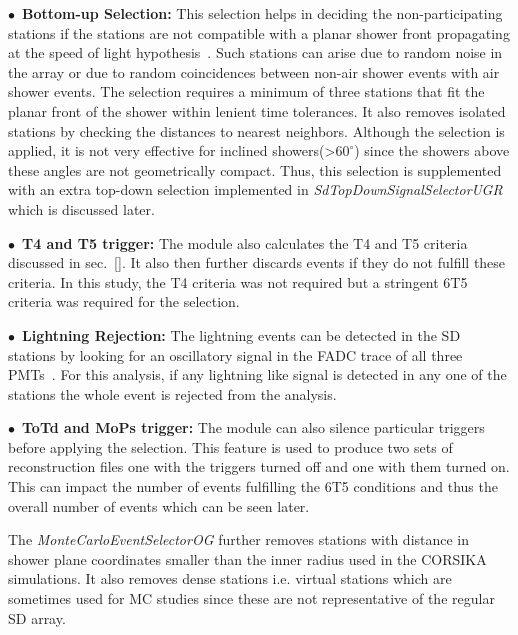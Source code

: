 \begin{description}
  \item $\bullet$~\textbf{Bottom-up Selection:} This selection helps in deciding the non-participating stations if the stations are not compatible with a planar shower front propagating at the speed of light hypothesis~\cite{}. Such stations can arise due to random noise in the array or due to random coincidences between non-air shower events with air shower events. The selection requires a minimum of three stations that fit the planar front of the shower within lenient time tolerances. It also removes isolated stations by checking the distances to nearest neighbors. Although the selection is applied, it is not very effective for inclined showers(>$60^{\circ}$) since the showers above these angles are not geometrically compact. Thus, this selection is supplemented with an extra top-down selection implemented in \textit{SdTopDownSignalSelectorUGR} which is discussed later. 
  \item $\bullet$~\textbf{T4 and T5 trigger:} The module also calculates the T4 and T5 criteria discussed in sec.~\ref{}. It also then further discards events if they do not fulfill these criteria. In this study, the T4 criteria was not required but a stringent 6T5 criteria was required for the selection. 
  \item $\bullet$~\textbf{Lightning Rejection:} The lightning events can be detected in the SD stations by looking for an oscillatory signal in the FADC trace of all three PMTs~\cite{}. For this analysis, if any lightning like signal is detected in any one of the stations the whole event is rejected from the analysis. 
  \item $\bullet$~\textbf{ToTd and MoPs trigger:} The module can also silence particular triggers before applying the selection. This feature is used to produce two sets of reconstruction files one with the triggers turned off and one with them turned on. This can impact the number of events fulfilling the 6T5 conditions and thus the overall number of events which can be seen later.    
\end{description}

The \textit{MonteCarloEventSelectorOG} further removes stations with distance in shower plane coordinates smaller than the inner radius used in the CORSIKA simulations. It also removes dense stations i.e. virtual stations which are sometimes used for MC studies since these are not representative of the regular SD array. 

